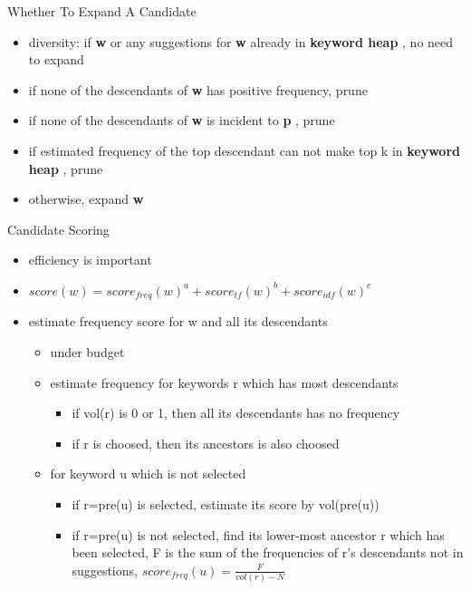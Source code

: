 \documentclass{beamer}
\newcommand{\page}{\textbf{p} }
\newcommand{\keyword}{\textbf{w} }
\newcommand{\kheap}{\textbf{keyword heap} }
\begin{document}
    \begin{frame}{Whether To Expand A Candidate}
        \begin{itemize}
        \item diversity: if \keyword or any suggestions for \keyword already in \kheap, no need to expand
        \item if none of the descendants of \keyword has positive frequency, prune
        \item if none of the descendants of \keyword is incident to \page, prune
        \item if estimated frequency of the top descendant can not make top k in \kheap, prune
        \item otherwise, expand \keyword
        \end{itemize}
    \end{frame}

    \begin{frame}{Candidate Scoring}
        \begin{itemize}
        \item efficiency is important
        \item $ score(w) = score_{freq}(w)^a + score_{tf}(w)^b + score_{idf}(w)^c $
        \item estimate frequency score for w and all its descendants
            \begin{itemize}
            \item under budget
            \item estimate frequency for keywords r which has most descendants
                \begin{itemize}
                \item if vol(r) is 0 or 1, then all its descendants has no frequency
                \item if r is choosed, then its ancestors is also choosed
                \end{itemize}
            \item for keyword u which is not selected
                \begin{itemize}
                \item if r=pre(u) is selected, estimate its score by vol(pre(u))
                \item if r=pre(u) is not selected, find its lower-most ancestor r which has been selected, F is the sum of the frequencies of r's descendants not in suggestions,  $ score_{freq}(u) = \frac{F}{vol(r)-N}  $
                \end{itemize}
            \end{itemize}
        \end{itemize}
    \end{frame}
\end{document}
